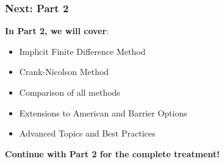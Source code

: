\documentclass[aspectratio=169]{beamer}
\begin{document}
\begin{frame}
\frametitle{Next: Part 2}
\textbf{In Part 2, we will cover}:
\begin{itemize}
\item Implicit Finite Difference Method
\item Crank-Nicolson Method
\item Comparison of all methods
\item Extensions to American and Barrier Options
\item Advanced Topics and Best Practices
\end{itemize}

\textbf{Continue with Part 2 for the complete treatment!}
\end{frame}
\end{document}
